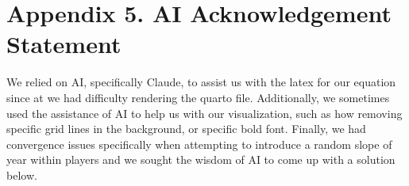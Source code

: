 \documentclass[
  12pt]{article}
\begin{document}
\newpage

\section{Appendix 5. AI Acknowledgement
Statement}\label{appendix-5.-ai-acknowledgement-statement}

We relied on AI, specifically Claude, to assist us with the latex for
our equation since at we had difficulty rendering the quarto file.
Additionally, we sometimes used the assistance of AI to help us with our
visualization, such as how removing specific grid lines in the
background, or specific bold font. Finally, we had convergence issues
specifically when attempting to introduce a random slope of year within
players and we sought the wisdom of AI to come up with a solution below.
\end{document}
